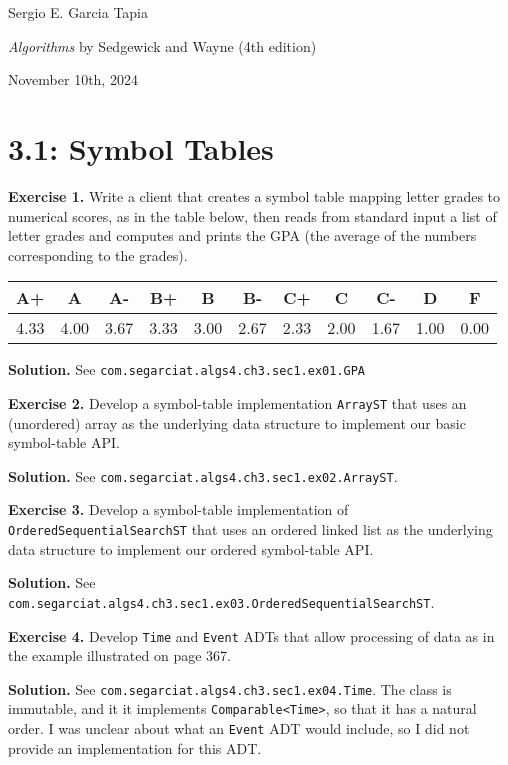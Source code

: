 \documentclass[12pt, a4paper]{article}
\newenvironment{ex}[2][Exercise]
{\par\medskip\noindent \textbf{#1 #2.}}
{\medskip}
\newenvironment{sol}[1][Solution]
{\par\medskip\noindent \textbf{#1.} }
{\medskip}
\begin{document}
	\noindent Sergio E. Garcia Tapia \hfill
	
	\noindent \emph{Algorithms} by Sedgewick and Wayne (4th edition) \cite{sedgewick_wayne}\hfill
	
	\noindent November 10th, 2024\hfill 
	\section*{3.1: Symbol Tables}
	\begin{ex}{1}
		Write a client that creates a symbol table mapping letter grades to numerical
		scores, as in the table below, then reads from standard input a list of letter grades
		and computes and prints the GPA (the average of the numbers corresponding to the
		grades).
		
		\begin{center}
			\begin{tabular}{c|c|c|c|c|c|c|c|c|c|c}
				A+ & A & A- & B+ & B & B- & C+ & C & C- & D & F\\
				\hline
				4.33 & 4.00 & 3.67 & 3.33 & 3.00 & 2.67 & 2.33 & 2.00 & 1.67 & 1.00 & 0.00
			\end{tabular}
		\end{center}
	\end{ex}
	\begin{sol}
		See \texttt{com.segarciat.algs4.ch3.sec1.ex01.GPA}
	\end{sol}
	\begin{ex}{2}
		Develop a symbol-table implementation \texttt{ArrayST} that uses an (unordered)
		array as the underlying data structure to implement our basic symbol-table API.
	\end{ex}
	\begin{sol}
		See \texttt{com.segarciat.algs4.ch3.sec1.ex02.ArrayST}.
	\end{sol}
	\begin{ex}{3}
		Develop a symbol-table implementation of \texttt{OrderedSequentialSearchST} that
		uses an ordered linked list as the underlying data structure to implement our
		ordered symbol-table API.
	\end{ex}
	\begin{sol}
		See \texttt{com.segarciat.algs4.ch3.sec1.ex03.OrderedSequentialSearchST}.
	\end{sol}
	\begin{ex}{4}
		Develop \texttt{Time} and \texttt{Event} ADTs that allow processing of data as in
		the example illustrated on page 367.
	\end{ex}
	\begin{sol}
		See \texttt{com.segarciat.algs4.ch3.sec1.ex04.Time}. The class is immutable, and it
		it implements \texttt{Comparable<Time>}, so that it has a natural order.
		I was unclear about what an \texttt{Event} ADT would include, so I did not provide
		an implementation for this ADT.
	\end{sol}
\end{document}
